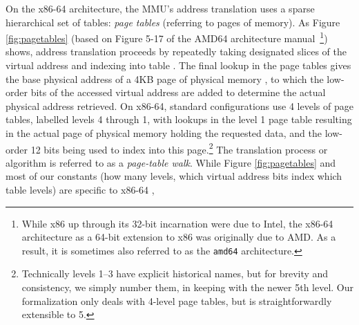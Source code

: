On the x86-64 architecture, the \textsc{MMU}'s address translation uses a sparse hierarchical set of tables:
\emph{page tables} (referring to pages of memory). As Figure \ref{fig:pagetables} (based on Figure 5-17 of the 
AMD64 architecture manual~\cite{amd64_manual_vol2}\footnote{While x86 up through its 32-bit incarnation were due to Intel,
the x86-64 architecture as a 64-bit extension to x86 was originally due to AMD. As a result, it is sometimes also referred to as the \texttt{amd64} architecture.})
shows,
address translation proceeds by repeatedly taking designated slices of the virtual address and indexing into  table .
The final lookup in the page tables gives the base physical address of a 4KB page of physical memory , to which the low-order
 bits of the accessed virtual address are added to determine the actual physical address retrieved.
On x86-64, standard configurations use 4 levels of page tables, labelled levels 4 through 1, with lookups in the level 
1 page table resulting in the actual page of physical memory holding the requested data, and the low-order 12 bits 
being used to index into this page.\footnote{Technically levels 1--3 have explicit historical names,
but for brevity and consistency, we simply number them, in keeping with the newer 5th level. Our formalization only deals with 4-level page tables, but is straightforwardly extensible to 5.} 
The translation process or algorithm is  referred to as a \emph{page-table walk}.
While Figure \ref{fig:pagetables} and most of our constants (how many levels, which virtual address bits index which
table levels) are specific to  x86-64 ,

